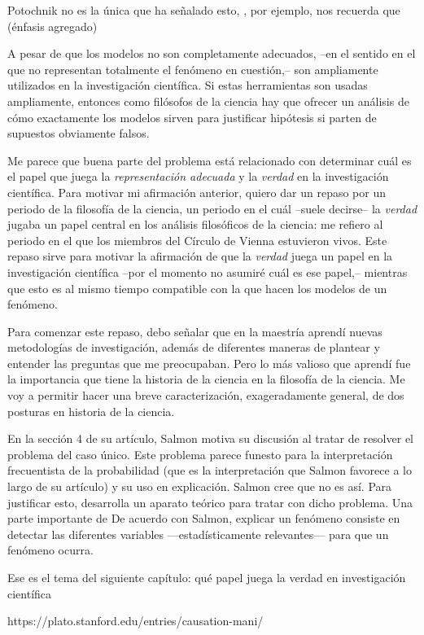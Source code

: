 Potochnik no es la única que ha señalado esto,
\textcite[][p.24]{abrams2023evolution}, por ejemplo, nos recuerda que
 (énfasis agregado)

A pesar de que los modelos no son completamente adecuados, --en el
sentido en el que no representan totalmente el fenómeno en
cuestión,-- son ampliamente utilizados en la investigación
científica. Si estas herramientas son usadas ampliamente, entonces
como filósofos de la ciencia hay que ofrecer un análisis de cómo
exactamente los modelos sirven para justificar hipótesis si parten de
supuestos obviamente falsos.

Me parece que buena parte del problema está relacionado con
determinar cuál es el papel que juega la \emph{representación
	adecuada} y la \emph{verdad} en la investigación científica. Para
motivar mi afirmación anterior, quiero dar un repaso por un periodo
de la filosofía de la ciencia, un periodo en el cuál --suele
decirse-- la \emph{verdad} jugaba un papel central en los análisis
filosóficos de la ciencia: me refiero al periodo en el que los
miembros del Círculo de Vienna estuvieron vivos. Este repaso sirve
para motivar la afirmación de que la \emph{verdad} juega un papel en
la investigación científica --por el momento no asumiré cuál es ese
papel,-- mientras que esto es al mismo tiempo compatible con la
 que hacen los modelos de un fenómeno.

Para comenzar este repaso, debo señalar que en la maestría aprendí
nuevas metodologías de investigación, además de diferentes maneras de
plantear y entender las preguntas que me preocupaban. Pero lo más
valioso que aprendí fue la importancia que tiene la historia de la
ciencia en la filosofía de la ciencia. Me voy a permitir hacer una
breve caracterización, exageradamente general, de dos posturas en
historia de la ciencia.

En la sección 4 de su artículo, Salmon motiva su discusión al tratar
de resolver el problema del caso único. Este problema parece funesto
para la interpretación frecuentista de la probabilidad (que es la
interpretación que Salmon favorece a lo largo de su artículo) y su
uso en explicación. Salmon cree que no es así. Para justificar esto,
desarrolla un aparato teórico para tratar con dicho problema. Una
parte importante de De acuerdo con Salmon, explicar un fenómeno
consiste en detectar las diferentes variables ---estadísticamente
relevantes--- para que un fenómeno ocurra.

Ese es el tema del siguiente capítulo: qué papel juega la
verdad en investigación científica



https://plato.stanford.edu/entries/causation-mani/
